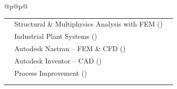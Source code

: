 \begin{tabular}{@{}p{\LeftWidth}@{\hspace{\MidSep}}p{\RightWidth}@{}}
\begin{minipage}[t]{\linewidth}
\begin{tabular}{@{}%
    >{\raggedleft\arraybackslash}m{\Aii}%
    @{\hspace{\ColSep}}%
    >{\RaggedRight\arraybackslash}m{\Bii}%
    @{\hspace{\ColSep}}%
    >{\centering\arraybackslash}m{\Cii}@{}}
  2020 & Structural \& Multiphysics Analysis with FEM (\inst{https://www.esss.co}{ESSS}) & \cert{https://manuelcaipocc.github.io/cv-caipo-latex/cv_links/courses/ANSYS_Courses.pdf} \\[\RowTight]
  2019 & Industrial Plant Systems (\inst{https://www.tecsup.edu.pe}{TECSUP}) & \cert{https://academico-cloud.tecsup.edu.pe/pcc/\#/home/certificado?c=350995\&n=AQP\%2FPCC\%2F17\%2F7778\&t=E} \\[\RowTight]
  2019 & Autodesk Nastran – FEM \& CFD (\inst{https://www.autodesk.com/de}{Autodesk}) & \cert{https://manuelcaipocc.github.io/cv-caipo-latex/cv_links/courses/Inventor_nastran.pdf} \\[\RowTight]
  2019 & Autodesk Inventor – CAD (\inst{https://www.autodesk.com/de}{Autodesk}) & \cert{https://manuelcaipocc.github.io/cv-caipo-latex/cv_links/courses/Inventor_certificate.pdf} \\[\RowTight]
  2018 & Process Improvement (\inst{https://www.proavance.com}{Proavance}) & \cert{https://manuelcaipocc.github.io/cv-caipo-latex/cv_links/courses/Process_management_improvement.pdf} \\[\RowTight]
      &                                                           & \\[-1em]
  \multicolumn{3}{@{}r@{}}{\tiny \textcolor{linksoft}{[Z] Certificate}}\\
  \end{tabular}
\end{minipage}
\\ %
\end{tabular}
